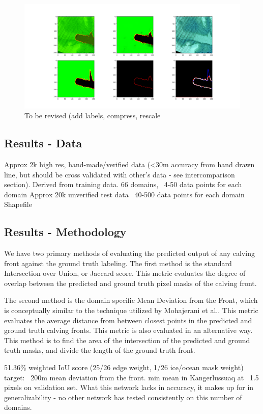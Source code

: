 \documentclass[tc, manuscript]{copernicus}
\begin{document}
\begin{figure}[t]
\includegraphics[width=18cm]{helheim_output.png}
To be revised (add labels, compress, rescale
\centering
\end{figure}
\subsection{Results - Data}
Approx 2k high res, hand-made/verified data (<30m accuracy from hand drawn line, but should be cross validated with other's data - see intercomparison section). Derived from training data. 66 domains, ~4-50 data points for each domain
Approx 20k unverified test data ~40-500 data points for each domain
Shapefile
\subsection{Results - Methodology}
We have two primary methods of evaluating the predicted output of any calving front against the ground truth labeling.
The first method is the standard Intersection over Union, or Jaccard score. This metric evaluates the degree of overlap between the predicted and ground truth pixel masks of the calving front. 

The second method is the domain specific Mean Deviation from the Front, which is conceptually similar to the technique utilized by Mohajerani et al.\cite{mohajerani-rs}. This metric evaluates the average distance from between closest points in the predicted and ground truth calving fronts. This metric is also evaluated in an alternative way. This method is to find the area of the intersection of the predicted and ground truth masks, and divide the length of the ground truth front.

51.36\% weighted IoU score (25/26 edge weight, 1/26 ice/ocean mask weight)
target: ~200m mean deviation from the front. min mean in Kangerlussuaq at ~1.5 pixels on validation set. What this network lacks in accuracy, it makes up for in generalizability - no other network has tested consistently on this number of domains.
\end{document}
